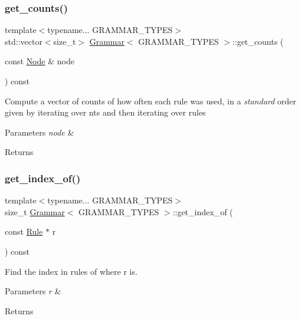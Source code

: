 \subsubsection{\texorpdfstring{get\+\_\+counts()}{get\_counts()}}
{\footnotesize\ttfamily template$<$typename... G\+R\+A\+M\+M\+A\+R\+\_\+\+T\+Y\+P\+ES$>$ \\
std\+::vector$<$size\+\_\+t$>$ \hyperlink{class_grammar}{Grammar}$<$ G\+R\+A\+M\+M\+A\+R\+\_\+\+T\+Y\+P\+ES $>$\+::get\+\_\+counts (\begin{DoxyParamCaption}\item[{const \hyperlink{class_node}{Node} \&}]{node }\end{DoxyParamCaption}) const\hspace{0.3cm}{\ttfamily [inline]}}

Compute a vector of counts of how often each rule was used, in a {\itshape standard} order given by iterating over nts and then iterating over rules 
\begin{DoxyParams}{Parameters}
{\em node} & \\
\hline
\end{DoxyParams}
\begin{DoxyReturn}{Returns}

\end{DoxyReturn}
\mbox{\label{class_grammar_a16885c3de4a6e3fd31ddab136cd9fea8}} 
\subsubsection{\texorpdfstring{get\+\_\+index\+\_\+of()}{get\_index\_of()}}
{\footnotesize\ttfamily template$<$typename... G\+R\+A\+M\+M\+A\+R\+\_\+\+T\+Y\+P\+ES$>$ \\
size\+\_\+t \hyperlink{class_grammar}{Grammar}$<$ G\+R\+A\+M\+M\+A\+R\+\_\+\+T\+Y\+P\+ES $>$\+::get\+\_\+index\+\_\+of (\begin{DoxyParamCaption}\item[{const \hyperlink{class_rule}{Rule} $\ast$}]{r }\end{DoxyParamCaption}) const\hspace{0.3cm}{\ttfamily [inline]}}

Find the index in rules of where r is. 
\begin{DoxyParams}{Parameters}
{\em r} & \\
\hline
\end{DoxyParams}
\begin{DoxyReturn}{Returns}

\end{DoxyReturn}
\mbox{\label{class_grammar_a9ed04fb2a2a8e2f0e4f11b711647a02c}} 
